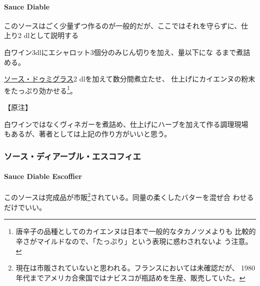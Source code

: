 \hypertarget{sauce-diable}{%
\paragraph{Sauce Diable}\label{sauce-diable}}

   

このソースはごく少量ずつ作るのが一般的だが、ここではそれを守らずに、仕
上り2\undemi{} dlとして説明する

白ワイン3dlにエシャロット3個分のみじん切りを加え、\untiers{}量以下にな
るまで煮詰める。

\protect\hyperlink{sauce-demi-glace}{ソース・ドゥミグラス}2
dlを加えて数分間煮立たせ、
仕上げにカイエンヌの粉末をたっぷり効かせる\footnote{唐辛子の品種としてのカイエンヌは日本で一般的なタカノツメよりも
  比較的辛さがマイルドなので、「たっぷり」という表現に惑わされないよ
  う注意。}。

【原注】

白ワインではなくヴィネガーを煮詰め、仕上げにハーブを加えて作る調理現場
もあるが、著者としては上記の作り方がいいと思う。

\maeaki

\hypertarget{ux30bdux30fcux30b9ux30c7ux30a3ux30a2ux30fcux30d6ux30ebux30a8ux30b9ux30b3ux30d5ux30a3ux30a8}{%
\subsubsection{ソース・ディアーブル・エスコフィエ}\label{ux30bdux30fcux30b9ux30c7ux30a3ux30a2ux30fcux30d6ux30ebux30a8ux30b9ux30b3ux30d5ux30a3ux30a8}}

\hypertarget{sauce-diable-escoffier}{%
\paragraph{Sauce Diable Escoffier}\label{sauce-diable-escoffier}}

   

このソースは完成品が市販\footnote{現在は市販されていないと思われる。フランスにおいては未確認だが、
  1980年代までアメリカ合衆国ではナビスコが瓶詰めを生産、販売していた。}されている。同量の柔くしたバターを混ぜ合
わせるだけでいい。

